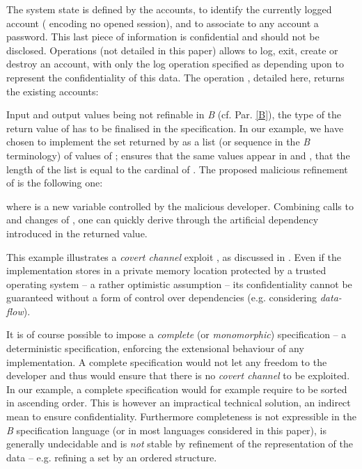 \documentclass[conference]{IEEEtran}
\begin{document}
The system state is defined by {\small} the accounts,
{\small} to identify the currently logged account ({\small} encoding
no opened session), and {\small} to associate to any account a password. This last
piece of information is confidential and should not be disclosed. Operations (not detailed in
this paper) allows to log, exit, create or destroy an account, with only the log operation
specified as depending upon {\small} to represent the confidentiality of this data.
The operation {\small}, detailed here, returns the existing accounts:

Input and output values being not refinable in \emph{B} (cf. Par. \ref{B}), the type of the
return value of {\small} has to be finalised in the specification. In our
example, we have chosen to implement the set {\small} returned by
{\small} as a list (or sequence in the \emph{B} terminology) {\small} of
values of {\small}; {\small} ensures that the same
values appear in {\small} and {\small},
{\small} that the length of the list
{\small} is equal to the cardinal of {\small}. The proposed malicious refinement
of {\small} is the following one:

where {\small} is a new variable controlled by the malicious developer.
Combining calls to {\small} and changes of {\small}, one can
quickly derive {\small} through the artificial dependency introduced in
the returned value.

This example illustrates a \emph{covert channel} exploit \cite{DBLP:journals/cacm/Lampson73},
as discussed in \cite{breakingmodel}. Even if the implementation stores {\small} in
a private memory location protected by a trusted operating system -- a rather optimistic
assumption -- its confidentiality cannot be guaranteed without a form of control over
dependencies (e.g. considering \emph{data-flow}).

It is of course possible to impose a \emph{complete} (or \emph{monomorphic}) specification
\cite{schonegge-proof} -- a deterministic specification, enforcing the extensional behaviour
of any implementation. A complete specification would not let any freedom to the developer
and thus would ensure that there is no \emph{covert channel} to be exploited. In our example,
a complete specification would for example require {\small} to be sorted in ascending
order. This is however an impractical technical solution, an indirect mean to ensure
confidentiality. Furthermore completeness is not expressible in the \emph{B} specification
language (or in most languages considered in this paper), is generally undecidable and is
\emph{not} stable by refinement of the representation of the data -- e.g. refining a set by an
ordered structure.
\end{document}
